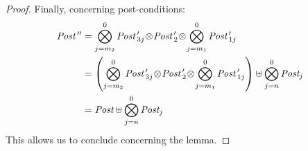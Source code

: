 \documentclass{lmcs}
\newcommand{\shortotimes}{\!\otimes\!}
\begin{document}
\begin{proof}
Finally, concerning post-conditions:
{\footnotesize \begin{equation*}
\begin{split}
\Post\,''&=\bigotimes_{j=m_2}^{0}\Post\,'_{3j}\shortotimes\Post\,'_2\shortotimes\bigotimes_{j=m_1}^{0}\Post\,'_{1j}\\
&=\left(\bigotimes_{j=m_2}^{0}\Post\,'_{3j}\shortotimes\Post\,'_2\shortotimes\bigotimes_{j=m_1}^{0}\Post\,'_{1j}\right)\uplus \bigotimes_{j=n}^{0}\Post_j\\
&=\Post \uplus \bigotimes_{j=n}^{0}\Post_j\
\end{split}
\end{equation*}
}
This allows us to conclude concerning the lemma. 
\end{proof}

\end{document}
